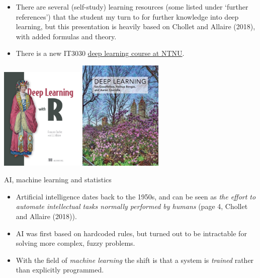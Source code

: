 \documentclass[10pt,ignorenonframetext,]{beamer}
\providecommand{\tightlist}{%
  \setlength{\itemsep}{0pt}\setlength{\parskip}{0pt}}
\begin{document}
\begin{frame}

\begin{itemize}
\tightlist
\item
  There are several (self-study) learning resources (some listed under
  `further references') that the student my turn to for further
  knowledge into deep learning, but this presentation is heavily based
  on Chollet and Allaire (2018), with added formulas and theory.
\item
  There is a new IT3030
  \href{https://www.ntnu.no/studier/emner/IT3030\#tab=omEmnet}{deep
  learning course at NTNU}.
\end{itemize}

\centering
\includegraphics[width=0.30000\textwidth]{DeepLearningwithR.jpeg}
\includegraphics[width=0.30000\textwidth]{DeepLearning.jpeg}

\end{frame}

\begin{frame}

\begin{block}{AI, machine learning and statistics}

\begin{itemize}
\item
  Artificial intelligence dates back to the 1950s, and can be seen as
  \emph{the effort to automate intellectual tasks normally performed by
  humans} (page 4, Chollet and Allaire (2018)).
\item
  AI was first based on hardcoded rules, but turned out to be
  intractable for solving more complex, fuzzy problems.
\item
  With the field of \emph{machine learning} the shift is that a system
  is \emph{trained} rather than explicitly programmed.
\end{itemize}

\end{block}

\end{frame}
\end{document}
